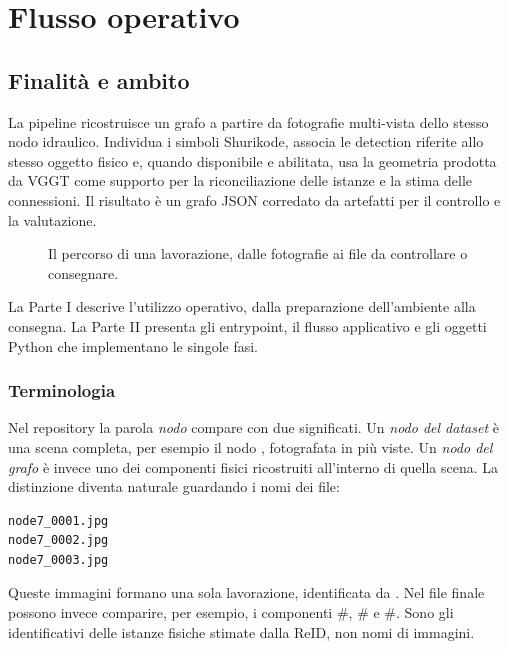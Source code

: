 \chapter{Flusso operativo}
\label{chap:lavorazione}

\section{Finalità e ambito}

La pipeline ricostruisce un grafo a partire da fotografie multi-vista dello
stesso nodo idraulico. Individua i simboli Shurikode, associa le detection
riferite allo stesso oggetto fisico e, quando disponibile e abilitata, usa la
geometria prodotta da VGGT come supporto per la riconciliazione delle istanze e
la stima delle connessioni. Il risultato è un grafo JSON corredato da artefatti
per il controllo e la valutazione.

\begin{figure}[H]
  \centering
  
  \caption{Il percorso di una lavorazione, dalle fotografie ai file da controllare o consegnare.}
  \label{fig:operational-workflow}
\end{figure}

La Parte I descrive l'utilizzo operativo, dalla preparazione dell'ambiente alla
consegna. La Parte II presenta gli entrypoint, il flusso applicativo e gli
oggetti Python che implementano le singole fasi.

\subsection{Terminologia}

Nel repository la parola \emph{nodo} compare con due significati. Un
\emph{nodo del dataset} è una scena completa, per esempio il nodo ,
fotografata in più viste. Un \emph{nodo del grafo} è invece uno dei componenti
fisici ricostruiti all'interno di quella scena. La distinzione diventa naturale
guardando i nomi dei file:

\begin{lstlisting}[language={}]
node7_0001.jpg
node7_0002.jpg
node7_0003.jpg
\end{lstlisting}

Queste immagini formano una sola lavorazione, identificata da . Nel
file finale possono invece comparire, per esempio, i componenti
\#, \# e
\#. Sono gli identificativi delle istanze
fisiche stimate dalla ReID, non nomi di immagini.

